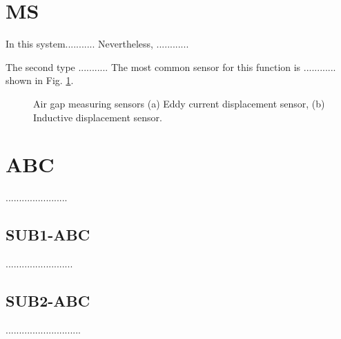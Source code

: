 \section{MS} 
\label{Measurement Sensors}
\noindent In this system...........
Nevertheless, ............

The second type ........... The most common sensor for this function is ............ shown in Fig. \ref{fig:gapsensor}.
\begin{figure}[!h!t]
	\centering
	\caption{Air gap measuring sensors (a) Eddy current displacement sensor, (b) Inductive displacement sensor.}
	\label{fig:gapsensor}
\end{figure}


\section{ABC} 
.......................
\subsection{SUB1-ABC}
.........................

\subsection{SUB2-ABC}
............................



